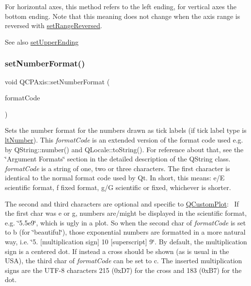 For horizontal axes, this method refers to the left ending, for vertical axes the bottom ending. Note that this meaning does not change when the axis range is reversed with \mbox{\hyperlink{class_q_c_p_axis_a2172fdb196b1a0dc3f40992fcad8e9e1}{set\+Range\+Reversed}}.

\begin{DoxySeeAlso}{See also}
\mbox{\hyperlink{class_q_c_p_axis_a69119b892fc306f651763596685aa377}{set\+Upper\+Ending}} 
\end{DoxySeeAlso}
\mbox{\label{class_q_c_p_axis_ae585a54dc2aac662e90a2ca82f002590}} 
\subsubsection{\texorpdfstring{set\+Number\+Format()}{setNumberFormat()}}
{\footnotesize\ttfamily void Q\+C\+P\+Axis\+::set\+Number\+Format (\begin{DoxyParamCaption}\item[{const Q\+String \&}]{format\+Code }\end{DoxyParamCaption})}

Sets the number format for the numbers drawn as tick labels (if tick label type is \mbox{\hyperlink{class_q_c_p_axis_a4a7da0166f755f5abac23b765d184cada7f1eacf3b73adaefd334bea04e094b7e}{lt\+Number}}). This {\itshape format\+Code} is an extended version of the format code used e.\+g. by Q\+String\+::number() and Q\+Locale\+::to\+String(). For reference about that, see the \char`\"{}\+Argument Formats\char`\"{} section in the detailed description of the Q\+String class. {\itshape format\+Code} is a string of one, two or three characters. The first character is identical to the normal format code used by Qt. In short, this means\+: \textquotesingle{}e\textquotesingle{}/\textquotesingle{}E\textquotesingle{} scientific format, \textquotesingle{}f\textquotesingle{} fixed format, \textquotesingle{}g\textquotesingle{}/\textquotesingle{}G\textquotesingle{} scientific or fixed, whichever is shorter.

The second and third characters are optional and specific to \mbox{\hyperlink{class_q_custom_plot}{Q\+Custom\+Plot}}\+:~\newline
If the first char was \textquotesingle{}e\textquotesingle{} or \textquotesingle{}g\textquotesingle{}, numbers are/might be displayed in the scientific format, e.\+g. \char`\"{}5.\+5e9\char`\"{}, which is ugly in a plot. So when the second char of {\itshape format\+Code} is set to \textquotesingle{}b\textquotesingle{} (for \char`\"{}beautiful\char`\"{}), those exponential numbers are formatted in a more natural way, i.\+e. \char`\"{}5.
\mbox{[}multiplication sign\mbox{]} 10 \mbox{[}superscript\mbox{]} 9\char`\"{}. By default, the multiplication sign is a centered dot. If instead a cross should be shown (as is usual in the U\+SA), the third char of {\itshape format\+Code} can be set to \textquotesingle{}c\textquotesingle{}. The inserted multiplication signs are the U\+T\+F-\/8 characters 215 (0x\+D7) for the cross and 183 (0x\+B7) for the dot.

